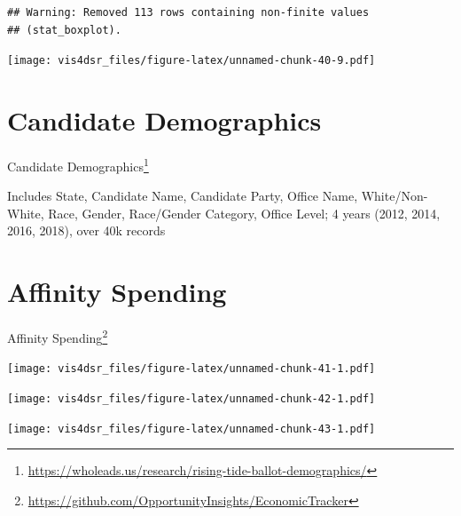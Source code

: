 \documentclass[
]{krantz}
\renewcommand{\href}[2]{#2\footnote{\url{#1}}}
\begin{document}
\begin{verbatim}
## Warning: Removed 113 rows containing non-finite values
## (stat_boxplot).
\end{verbatim}

\texttt{[image: vis4dsr\_files/figure-latex/unnamed-chunk-40-9.pdf]}

\hypertarget{candidate-demographics}{%
\section*{Candidate Demographics}\label{candidate-demographics}}


\href{https://wholeads.us/research/rising-tide-ballot-demographics/}{Candidate Demographics}

Includes State, Candidate Name, Candidate Party, Office Name, White/Non-White, Race, Gender, Race/Gender Category, Office Level; 4 years (2012, 2014, 2016, 2018), over 40k records

\hypertarget{affinity-spending}{%
\section*{Affinity Spending}\label{affinity-spending}}


\href{https://github.com/OpportunityInsights/EconomicTracker}{Affinity Spending}

\texttt{[image: vis4dsr\_files/figure-latex/unnamed-chunk-41-1.pdf]}

\texttt{[image: vis4dsr\_files/figure-latex/unnamed-chunk-42-1.pdf]}

\texttt{[image: vis4dsr\_files/figure-latex/unnamed-chunk-43-1.pdf]}

  

\backmatter
\printindex
\end{document}

